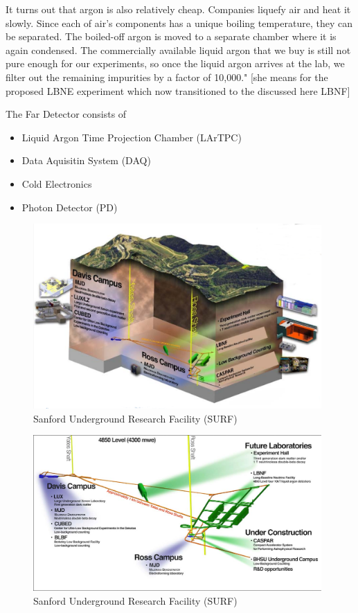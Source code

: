 It turns out that argon is also relatively cheap. Companies liquefy air and heat it slowly. Since each of air's components has a unique boiling temperature, they can be separated. The boiled-off argon is moved to a separate chamber where it is again condensed. The commercially available liquid argon that we buy is still not pure enough for our experiments, so once the liquid argon arrives at the lab, we filter out the remaining impurities by a factor of 10,000." [she means for the proposed LBNE experiment which now transitioned to the discussed here LBNF] 

The Far Detector consists of 
\begin{itemize}
  \item Liquid Argon Time Projection Chamber (LArTPC)
  \item Data Aquisitin System (DAQ)
  \item Cold Electronics
  \item Photon Detector (PD)
\end{itemize}

\begin{figure}
\caption{Sanford Underground Research Facility (SURF)}
\label{fig:farDetector_SURF1}
\centering
\includegraphics[width=0.98\textwidth, keepaspectratio=true]{figs/farDetector_SanfordUndergroundResearchFacility.png}
\end{figure}

\begin{figure}
\caption{Sanford Underground Research Facility (SURF)}
\label{fig:farDetector_SURF2}
\centering
\includegraphics[width=0.98\textwidth, keepaspectratio=true]{figs/farDetector_wholeLab.png}
\end{figure}

